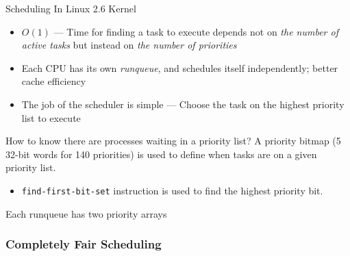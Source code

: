 \begin{frame}{Scheduling In Linux 2.6 Kernel}
  \begin{itemize}
  \item[\good] $O(1)$ --- Time for finding a task to execute depends not on \emph{the
      number of active tasks} but instead on \emph{the number of priorities}
  \item[\good] Each CPU has its own \emph{runqueue}, and schedules itself independently; better cache
    efficiency
  \item The job of the scheduler is simple --- Choose the task on the highest priority list to
    execute
  \end{itemize}
  \begin{block}{How to know there are processes waiting in a priority list?}
    A priority bitmap (5 32-bit words for 140 priorities) is used to define when tasks are on a
    given priority list.
    \begin{itemize}
    \item \texttt{find-first-bit-set} instruction is used to find the highest priority bit.
    \end{itemize}
  \end{block}
\end{frame}

\begin{frame}%
  \begin{iblock}{Each runqueue has two priority arrays}
    \begin{center}
    \end{center}
  \end{iblock}
\end{frame}

\subsubsection{Completely Fair Scheduling}
\label{sec:compl-fair-sched}

